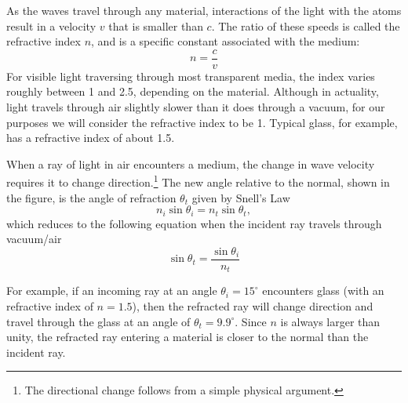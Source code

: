 As the waves travel through any material, interactions of the light with the atoms result in a velocity $v$ that is smaller than $c$. The ratio of these speeds is called the refractive index $n$, and is a specific constant associated with the medium:
\begin{equation}
    n = \frac{c}{v}
\end{equation}
For visible light traversing through most transparent media, the index varies roughly between 1 and 2.5, depending on the material. Although in actuality, light travels through air slightly slower than it does through a vacuum, for our purposes we will consider the refractive index to be 1. Typical glass, for example, has a refractive index of about 1.5.\myskip

When a ray of light in air encounters a medium, the change in wave velocity requires it to change direction.\footnote{The directional change follows from a simple physical argument.}  The new angle relative to the normal, shown in the figure, is the angle of refraction $\theta_{t}$ given by Snell's Law
\begin{equation}
    n_{i}\sin \theta_{i} = n_{t} \sin \theta_{t},
\end{equation}
which reduces to the following equation when the incident ray travels through vacuum/air
\begin{equation}
    \sin \theta_{t} = \frac{\sin \theta_{i}}{n_{t}}
\end{equation}
 
For example, if an incoming ray at an angle $\theta_{i} = 15^\circ$ encounters glass (with an refractive index of $n = 1.5$), then the refracted ray will change direction and travel through the glass at an angle of $\theta_{t} = 9.9^\circ$.  Since $n$ is always larger than unity, the refracted ray entering a material is closer to the normal than the incident ray.\myskip


